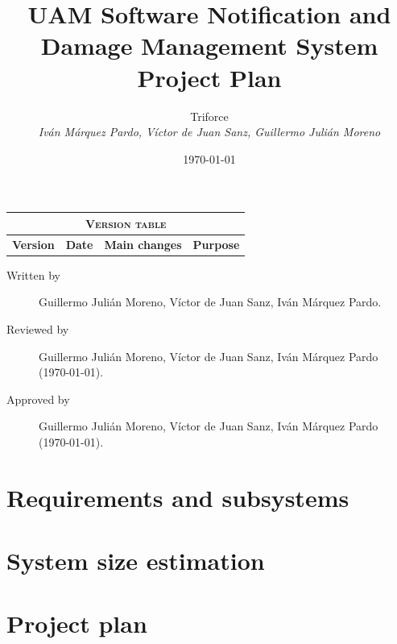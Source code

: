 \documentclass[11pt]{report}
\title{UAM Software Notification and Damage Management System \\ Project Plan}
\date{\today}
\author{{\Large Triforce} \\ \vspace{5pt} \textit{Iván Márquez Pardo, Víctor de Juan Sanz, Guillermo Julián Moreno}}
\begin{document}
\maketitle

\begin{table}[hbtp]
\centering
\begin{tabular}{|c|c|p{3cm}|p{3.5cm}|}
\hline \multicolumn{4}{|c|}{\textsc{Version table}} \\ \hline \hline
\textbf{Version} & \textbf{Date} & \textbf{Main changes} & \textbf{Purpose} \\ \hline
\end{tabular}
\end{table}

\begin{description}
\item[Written by] Guillermo Julián Moreno, Víctor de Juan Sanz, Iván Márquez Pardo.
\item[Reviewed by] Guillermo Julián Moreno, Víctor de Juan Sanz, Iván Márquez Pardo (\today).
\item[Approved by] Guillermo Julián Moreno, Víctor de Juan Sanz, Iván Márquez Pardo (\today).
\end{description}

\newpage

\begin{abstract}
\end{abstract}

\tableofcontents
\newpage
\pagestyle{plain}

\chapter{Requirements and subsystems}



\chapter{System size estimation}


\chapter{Project plan}

\end{document}
